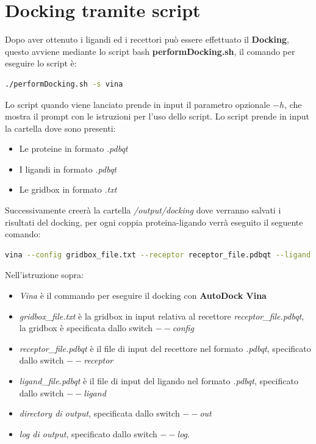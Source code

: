 \section{Docking tramite script}
Dopo aver ottenuto i ligandi ed i recettori può essere effettuato il \textbf{Docking}, questo avviene mediante lo script bash \textbf{performDocking.sh}, il comando per eseguire lo script è:

\begin{lstlisting}[language=bash, label=lst:code29, caption={Comando per eseguire performDocking}]
./performDocking.sh -s vina
\end{lstlisting}

Lo script quando viene lanciato prende in input il parametro opzionale $-h$, che mostra il prompt con le istruzioni per l'uso dello script.\newline
Lo script prende in input la cartella dove sono presenti:

\begin{itemize}
    \item Le proteine in formato \textit{.pdbqt}
    \item I ligandi in formato \textit{.pdbqt}
    \item Le gridbox in formato \textit{.txt}
\end{itemize}

Successivamente creerà la cartella \textit{/output/docking} dove verranno salvati i risultati del docking, per ogni coppia proteina-ligando verrà eseguito il seguente comando:

\begin{lstlisting}[language=bash, label=lst:code30, caption={Comando per eseguire il docking con Autodock Vina}]
vina --config gridbox_file.txt --receptor receptor_file.pdbqt --ligand ligand_file.pdbqt --out "{percorso_directory_software_installato}/output/docking/vina/cartella_nome_recettore/cartella_nome_ligando/out.pdbqt" --log "{percorso_directory_software_installato}/output/docking/vina/cartella_nome_recettore/cartella_nome_ligando/log.txt"
\end{lstlisting}

Nell'istruzione sopra:
\begin{itemize}
    \item \textit{Vina} è il commando per eseguire il docking con \textbf{AutoDock Vina}
    \item \textit{gridbox\_file.txt} è la gridbox in input relativa al recettore \textit{receptor\_file.pdbqt}, la gridbox è specificata dallo switch \textit{$--$config}
    \item \textit{receptor\_file.pdbqt} è il file di input del recettore nel formato \textit{.pdbqt}, specificato dallo switch \textit{$--$receptor}
    \item \textit{ligand\_file.pdbqt} è il file di input del ligando nel formato \textit{.pdbqt}, specificato dallo switch \textit{$--$ligand}
    \item \textit{directory di output}, specificata dallo switch \textit{$--$out}
    \item \textit{log di output}, specificato dallo switch \textit{$--$log}.
\end{itemize}

